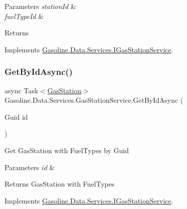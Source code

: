 \begin{DoxyParams}{Parameters}
{\em station\+Id} & \\
\hline
{\em fuel\+Type\+Id} & \\
\hline
\end{DoxyParams}
\begin{DoxyReturn}{Returns}

\end{DoxyReturn}


Implements \mbox{\hyperlink{interface_gasoline_1_1_data_1_1_services_1_1_i_gas_station_service_a2d8ab6257dbfd8bf3ade23604bf33ca2}{Gasoline.\+Data.\+Services.\+I\+Gas\+Station\+Service}}.

\mbox{\label{class_gasoline_1_1_data_1_1_services_1_1_gas_station_service_a27d422e0840d24e1a45682f4dd293b7b}} 
\subsubsection{\texorpdfstring{GetByIdAsync()}{GetByIdAsync()}}
{\footnotesize\ttfamily async Task$<$\mbox{\hyperlink{class_gasoline_1_1_data_1_1_models_1_1_gas_station}{Gas\+Station}}$>$ Gasoline.\+Data.\+Services.\+Gas\+Station\+Service.\+Get\+By\+Id\+Async (\begin{DoxyParamCaption}\item[{Guid}]{id }\end{DoxyParamCaption})}



Get Gas\+Station with Fuel\+Types by Guid 


\begin{DoxyParams}{Parameters}
{\em id} & \\
\hline
\end{DoxyParams}
\begin{DoxyReturn}{Returns}
Gas\+Station with Fuel\+Types
\end{DoxyReturn}


Implements \mbox{\hyperlink{interface_gasoline_1_1_data_1_1_services_1_1_i_gas_station_service_addc95df8cbebea3094ad37655746bba2}{Gasoline.\+Data.\+Services.\+I\+Gas\+Station\+Service}}.

\mbox{\label{class_gasoline_1_1_data_1_1_services_1_1_gas_station_service_a1b190190220d302d763a55ce77e7de50}} 
